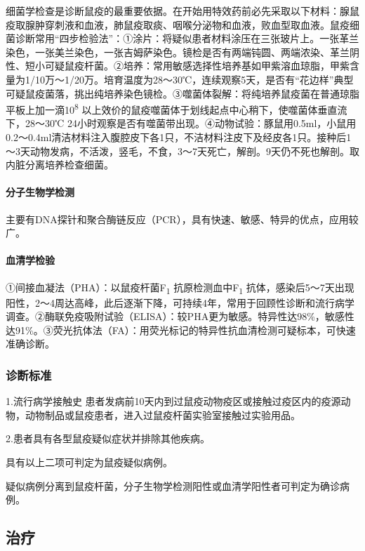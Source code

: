 细菌学检查是诊断鼠疫的最重要依据。在开始用特效药前必先采取以下材料：腺鼠疫取腺肿穿刺液和血液，肺鼠疫取痰、咽喉分泌物和血液，败血型取血液。鼠疫细菌诊断常用“四步检验法”：①涂片：将疑似患者材料涂压在三张玻片上。一张革兰染色，一张美兰染色，一张吉姆萨染色。镜检是否有两端钝圆、两端浓染、革兰阴性、短小可疑鼠疫杆菌。②培养：常用敏感选择性培养基如甲紫溶血琼脂，甲紫含量为1/10万～1/20万。培育温度为28～30℃，连续观察5天，是否有“花边样”典型可疑鼠疫菌落，挑出纯培养染色镜检。③噬菌体裂解：将纯培养鼠疫菌在普通琼脂平板上加一滴10\textsuperscript{8}
以上效价的鼠疫噬菌体于划线起点中心稍下，使噬菌体垂直流下，28～30℃
24小时观察是否有噬菌带出现。④动物试验：豚鼠用0.5ml，小鼠用0.2～0.4ml清洁材料注入腹腔皮下各1只，不洁材料注皮下及经皮各1只。接种后1～3天动物发病，不活泼，竖毛，不食，3～7天死亡，解剖。9天仍不死也解剖。取内脏分离培养检查细菌。

\paragraph{分子生物学检测}

主要有DNA探针和聚合酶链反应（PCR），具有快速、敏感、特异的优点，应用较广。

\paragraph{血清学检验}

①间接血凝法（PHA）：以鼠疫杆菌F\textsubscript{1}
抗原检测血中F\textsubscript{1}
抗体，感染后5～7天出现阳性，2～4周达高峰，此后逐渐下降，可持续4年，常用于回顾性诊断和流行病学调查。②酶联免疫吸附试验（ELISA）：较PHA更为敏感。特异性达98\%，敏感性达91\%。③荧光抗体法（FA）：用荧光标记的特异性抗血清检测可疑标本，可快速准确诊断。

\subsubsection{诊断标准}

1.流行病学接触史
患者发病前10天内到过鼠疫动物疫区或接触过疫区内的疫源动物，动物制品或鼠疫患者，进入过鼠疫杆菌实验室接触过实验用品。

2.患者具有各型鼠疫疑似症状并排除其他疾病。

具有以上二项可判定为鼠疫疑似病例。

疑似病例分离到鼠疫杆菌，分子生物学检测阳性或血清学阳性者可判定为确诊病例。

\subsection{治疗}

